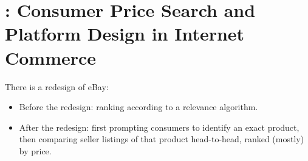 \section{\cite{dinerstein2018consumer}: Consumer Price Search and Platform Design in Internet Commerce}
There is a redesign of eBay:
\begin{itemize}
    \item Before the redesign: ranking according to a relevance algorithm.
    \item After the redesign: first prompting consumers to identify an exact product, then comparing seller listings of that product  head-to-head, ranked (mostly) by price.
\end{itemize}
